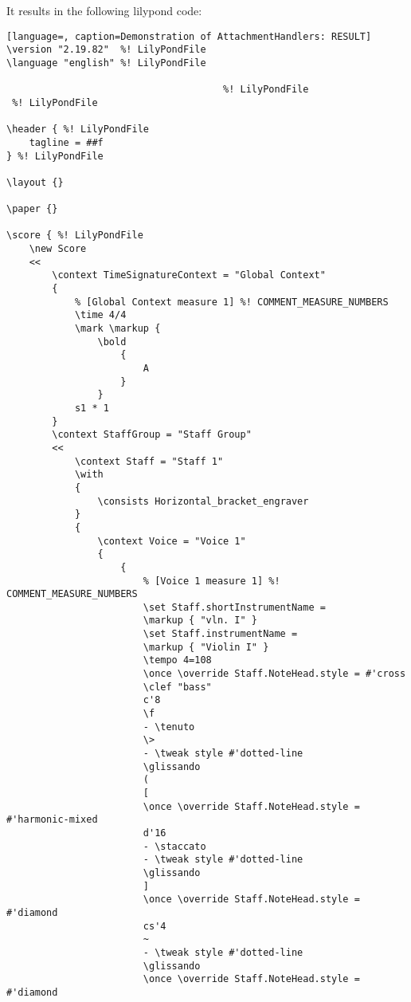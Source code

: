 It results in the following lilypond code:

\singlespace
\begin{lstlisting}[language=, caption=Demonstration of AttachmentHandlers: RESULT]
\version "2.19.82"  %! LilyPondFile
\language "english" %! LilyPondFile

                                      %! LilyPondFile
 %! LilyPondFile

\header { %! LilyPondFile
    tagline = ##f
} %! LilyPondFile

\layout {}

\paper {}

\score { %! LilyPondFile
    \new Score
    <<
        \context TimeSignatureContext = "Global Context"
        {
            % [Global Context measure 1] %! COMMENT_MEASURE_NUMBERS
            \time 4/4
            \mark \markup {
                \bold
                    {
                        A
                    }
                }
            s1 * 1
        }
        \context StaffGroup = "Staff Group"
        <<
            \context Staff = "Staff 1"
            \with
            {
                \consists Horizontal_bracket_engraver
            }
            {
                \context Voice = "Voice 1"
                {
                    {
                        % [Voice 1 measure 1] %! COMMENT_MEASURE_NUMBERS
                        \set Staff.shortInstrumentName =
                        \markup { "vln. I" }
                        \set Staff.instrumentName =
                        \markup { "Violin I" }
                        \tempo 4=108
                        \once \override Staff.NoteHead.style = #'cross
                        \clef "bass"
                        c'8
                        \f
                        - \tenuto
                        \>
                        - \tweak style #'dotted-line
                        \glissando
                        (
                        [
                        \once \override Staff.NoteHead.style = #'harmonic-mixed
                        d'16
                        - \staccato
                        - \tweak style #'dotted-line
                        \glissando
                        ]
                        \once \override Staff.NoteHead.style = #'diamond
                        cs'4
                        ~
                        - \tweak style #'dotted-line
                        \glissando
                        \once \override Staff.NoteHead.style = #'diamond

\end{lstlisting}
